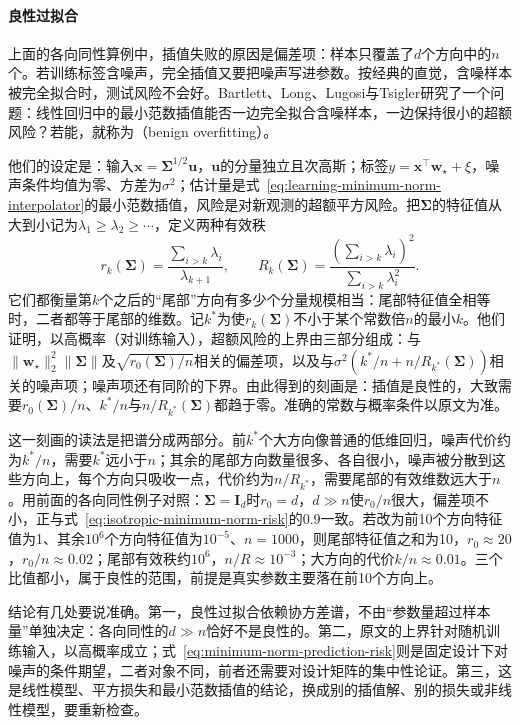 \paragraph{良性过拟合}
\label{sec:benign-overfitting}

上面的各向同性算例中，插值失败的原因是偏差项：样本只覆盖了$d$个方向中的$n$个。若训练标签含噪声，完全插值又要把噪声写进参数。按经典的直觉，含噪样本被完全拟合时，测试风险不会好。Bartlett、Long、Lugosi与Tsigler研究了一个问题：线性回归中的最小范数插值能否一边完全拟合含噪样本，一边保持很小的超额风险？若能，就称为（benign overfitting）。

他们的设定是：输入$\bm x=\bm\Sigma^{1/2}\bm u$，$\bm u$的分量独立且次高斯；标签$y=\bm x^\top\bm w_\star+\xi$，噪声条件均值为零、方差为$\sigma^2$；估计量是式~\eqref{eq:learning-minimum-norm-interpolator}的最小范数插值，风险是对新观测的超额平方风险。把$\bm\Sigma$的特征值从大到小记为$\lambda_1\geq\lambda_2\geq\cdots$，定义两种有效秩
\[
 r_k(\bm\Sigma)=\frac{\sum_{i>k}\lambda_i}{\lambda_{k+1}},
 \qquad
 R_k(\bm\Sigma)=\frac{(\sum_{i>k}\lambda_i)^2}{\sum_{i>k}\lambda_i^2}.
\]
它们都衡量第$k$个之后的“尾部”方向有多少个分量规模相当：尾部特征值全相等时，二者都等于尾部的维数。记$k^*$为使$r_k(\bm\Sigma)$不小于某个常数倍$n$的最小$k$。他们证明，以高概率（对训练输入），超额风险的上界由三部分组成：与$\|\bm w_\star\|_2^2\|\bm\Sigma\|$及$\sqrt{r_0(\bm\Sigma)/n}$相关的偏差项，以及与$\sigma^2(k^*/n+n/R_{k^*}(\bm\Sigma))$相关的噪声项；噪声项还有同阶的下界。由此得到的刻画是：插值是良性的，大致需要$r_0(\bm\Sigma)/n$、$k^*/n$与$n/R_{k^*}(\bm\Sigma)$都趋于零。准确的常数与概率条件以原文为准。

这一刻画的读法是把谱分成两部分。前$k^*$个大方向像普通的低维回归，噪声代价约为$k^*/n$，需要$k^*$远小于$n$；其余的尾部方向数量很多、各自很小，噪声被分散到这些方向上，每个方向只吸收一点，代价约为$n/R_{k^*}$，需要尾部的有效维数远大于$n$。用前面的各向同性例子对照：$\bm\Sigma=\bm I_d$时$r_0=d$，$d\gg n$使$r_0/n$很大，偏差项不小，正与式~\eqref{eq:isotropic-minimum-norm-risk}的0.9一致。若改为前10个方向特征值为1、其余$10^6$个方向特征值为$10^{-5}$、$n=1000$，则尾部特征值之和为10，$r_0\approx20$，$r_0/n\approx0.02$；尾部有效秩约$10^6$，$n/R\approx10^{-3}$；大方向的代价$k/n\approx0.01$。三个比值都小，属于良性的范围，前提是真实参数主要落在前10个方向上。

结论有几处要说准确。第一，良性过拟合依赖协方差谱，不由“参数量超过样本量”单独决定：各向同性的$d\gg n$恰好不是良性的。第二，原文的上界针对随机训练输入，以高概率成立；式~\eqref{eq:minimum-norm-prediction-risk}则是固定设计下对噪声的条件期望，二者对象不同，前者还需要对设计矩阵的集中性论证。第三，这是线性模型、平方损失和最小范数插值的结论，换成别的插值解、别的损失或非线性模型，要重新检查。

